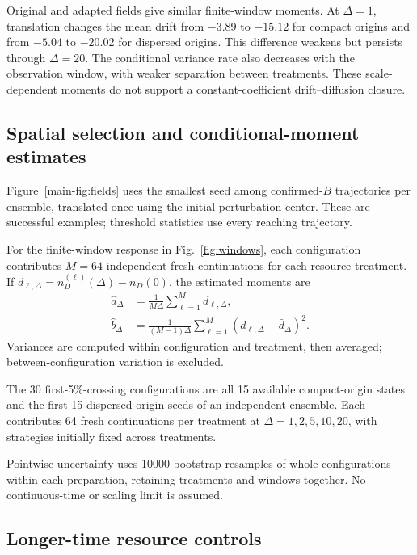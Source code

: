 Original and adapted fields give similar finite-window moments. At $\Delta=1$, translation changes the mean drift from $-3.89$ to $-15.12$ for compact origins and from $-5.04$ to $-20.02$ for dispersed origins. This difference weakens but persists through $\Delta=20$. The conditional variance rate also decreases with the observation window, with weaker separation between treatments. These scale-dependent moments do not support a constant-coefficient drift--diffusion closure.

\subsection{Spatial selection and conditional-moment estimates}

Figure~\ref{main-fig:fields} uses the smallest seed among confirmed-$B$ trajectories per ensemble, translated once using the initial perturbation center. These are successful examples; threshold statistics use every reaching trajectory.

For the finite-window response in Fig.~\ref{fig:windows}, each configuration contributes $M=64$ independent fresh continuations for each resource treatment. If $d_{\ell,\Delta}=n_D^{(\ell)}(\Delta)-n_D(0)$, the estimated moments are
\begin{equation}
\label{eq:moment_estimators}
\begin{aligned}
\widehat a_\Delta&=\frac{1}{M\Delta}\sum_{\ell=1}^M d_{\ell,\Delta},\\
\widehat b_\Delta&=\frac{1}{(M-1)\Delta}
\sum_{\ell=1}^M(d_{\ell,\Delta}-\bar d_\Delta)^2.
\end{aligned}
\end{equation}
Variances are computed within configuration and treatment, then averaged; between-configuration variation is excluded.

The 30 first-5\%-crossing configurations are all 15 available compact-origin states and the first 15 dispersed-origin seeds of an independent ensemble. Each contributes 64 fresh continuations per treatment at $\Delta=1,2,5,10,20$, with strategies initially fixed across treatments.

Pointwise uncertainty uses 10000 bootstrap resamples \cite{efron1979bootstrap} of whole configurations within each preparation, retaining treatments and windows together. No continuous-time or scaling limit is assumed.

\subsection{Longer-time resource controls}

